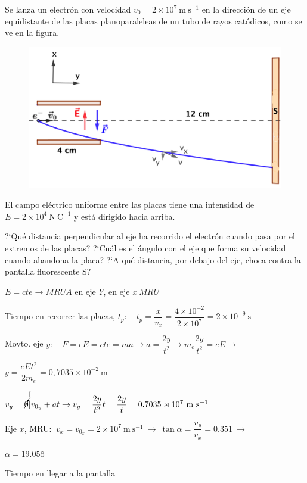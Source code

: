 \begin{prob}
Se lanza un electrón con velocidad $v_0=2\times 10^7	 \ \mathrm{m\ s}^{-1}$ en la dirección de un eje equidistante de las placas planoparaleleas de un tubo de rayos catódicos, como se ve en la figura.

\begin{figure}[H]
	\centering
	\includegraphics[width=.8\textwidth]{imagenes/imagenes22/T22IM17.png}
\end{figure}

El campo eléctrico uniforme entre las placas tiene una intensidad de $E = 2\times 10^{4} \ \mathrm{N \ C}^{-1}$ y está dirigido hacia arriba.

 ?`Qué distancia perpendicular al eje ha recorrido el electrón cuando pasa por el extremos de las placas?
 ?`Cuál es el ángulo con el eje que forma su velocidad cuando abandona la placa?
?`A qué distancia, por debajo del eje, choca contra la pantalla fluorescente S?

\end{prob}

$E=cte \to MRUA$ en eje $Y$, en eje $x \ MRU$

Tiempo en recorrer las placas, $t_p: \quad t_p=\dfrac x {v_x}=\dfrac{4\times 10^{-2}}{2\times 10^7}=2\times 10^{-9} \ \mathrm{s}$

Movto. eje $y:\quad F=eE=cte=ma \to a=\dfrac{2y}{t^2} \to m_e\dfrac{2y}{t^2}=eE \to$

$ y=\dfrac{eEt^2}{2m_e}=0,7035\times 10^{-2} \ \mathrm{m}$

$v_y=\cancelto[0]{v_{0_y}}+at \to v_y=\dfrac{2y}{t^2}t=\dfrac{2y}{t}=0.7035\rtimes 10^{7}\ \mathrm{m\ s}^{-1}$

Eje $x$, MRU: $\ v_x=v_{0_x}=2\times 10^7\ \mathrm{m\  s}^{-1} \ \to \ \tan \alpha=\dfrac{v_y}{v_x}=0.351 \ \to \ $

$\alpha=19.05ô$

Tiempo en llegar a la pantalla 

